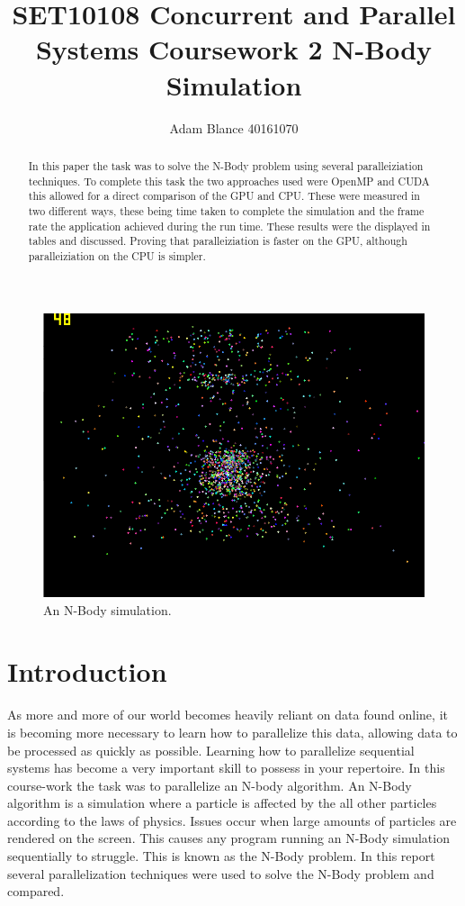 \documentclass[12pt]{article}
\author{Adam Blance 40161070}
\begin{document}
	\title{SET10108 Concurrent and Parallel Systems \linebreak Coursework 2 \linebreak N-Body Simulation}
	\maketitle
\begin{abstract}
In this paper the task was to solve the N-Body problem using several paralleiziation techniques. To complete this task the two approaches used were OpenMP and CUDA this allowed for a direct comparison of the GPU and CPU. These were measured in two different ways, these being time taken to complete the simulation and the frame rate the application achieved during the run time. These results were the displayed in tables and discussed. Proving that paralleiziation is faster on the GPU, although paralleiziation on the CPU is simpler.
		
\end{abstract}
\begin{figure}
	\centering
	\includegraphics[scale=0.5]{pics/intro.png}
	\caption{An N-Body simulation.}
\end{figure}
\newpage 		
\section{Introduction}
As more and more of our world becomes heavily reliant on data found online, it is  becoming more necessary to learn how to parallelize this data, allowing data to be processed as quickly as possible.  Learning how to parallelize sequential systems has become a very important skill to possess in your repertoire. 
\newline 
In this course-work the task was to parallelize an N-body algorithm. An N-Body algorithm is a simulation where a particle is affected by the all other particles according to the laws of physics. Issues occur when large amounts of particles are rendered on the screen. This causes any program running an N-Body simulation sequentially to struggle. This is known as the N-Body problem. In this report several
parallelization techniques were used to solve the N-Body problem and compared.
\end{document}
